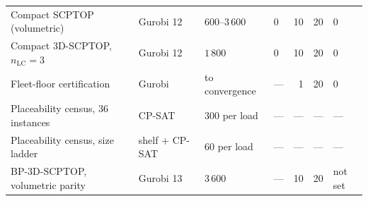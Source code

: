\begin{table}[!htbp]
{\begin{tabular}{llllrrl}
Compact SCPTOP (volumetric) & Gurobi 12 & $600$--$3\,600$ & $0$ & 10 & 20 & 0 \\
Compact 3D-SCPTOP, $n_{\mathrm{LC}}=3$ & Gurobi 12 & $1\,800$ & $0$ & 10 & 20 & 0 \\
Fleet-floor certification & Gurobi & to convergence & --- & 1 & 20 & 0 \\
Placeability census, 36 instances & CP-SAT & $300$ per load & --- & --- & --- & --- \\
Placeability census, size ladder & shelf + CP-SAT & $60$ per load & --- & --- & --- & --- \\
BP-3D-SCPTOP, volumetric parity & Gurobi 13 & $3\,600$ & --- & 10 & 20 & not set \\
\bottomrule
\end{tabular}}
\end{table}
